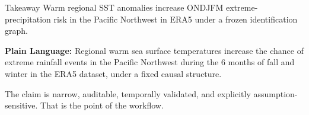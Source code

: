 \documentclass[aspectratio=169]{beamer}
\begin{document}
\begin{frame}{Takeaway}
\Large
Warm regional SST anomalies increase ONDJFM extreme-precipitation risk in the
Pacific Northwest in ERA5 under a frozen identification graph.

\vspace{0.5cm}

\textbf{Plain Language:} Regional warm sea surface temperatures increase 
the chance of extreme rainfall events in the Pacific Northwest during the 
6 months of fall and winter in the ERA5 dataset, under a fixed causal structure.

\vspace{0.5cm}
\normalsize
The claim is narrow, auditable, temporally validated, and explicitly
assumption-sensitive. That is the point of the workflow.
\end{frame}
\end{document}
